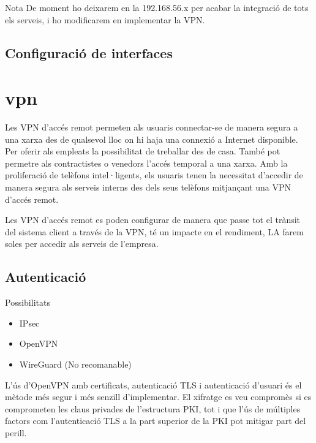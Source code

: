 \documentclass[
  10pt,
]{krantz}
\providecommand{\tightlist}{%
  \setlength{\itemsep}{0pt}\setlength{\parskip}{0pt}}
\begin{document}
\begin{rmdnote}{Nota}
De moment ho deixarem en la 192.168.56.x per acabar la integració de tots els serveis, i ho modificarem en implementar la VPN.

\end{rmdnote}

\hypertarget{configuraciuxf3-de-interfaces}{%
\subsection{Configuració de interfaces}\label{configuraciuxf3-de-interfaces}}

\hypertarget{vpn}{%
\section{vpn}\label{vpn}}

Les VPN d'accés remot permeten als usuaris connectar-se de manera segura a una xarxa des de qualsevol lloc on hi haja una connexió a Internet disponible. Per oferir als empleats la possibilitat de treballar des de casa. També pot permetre als contractistes o venedors l'accés temporal a una xarxa. Amb la proliferació de telèfons intel·ligents, els usuaris tenen la necessitat d'accedir de manera segura als serveis interns des dels seus telèfons mitjançant una VPN d'accés remot.

Les VPN d'accés remot es poden configurar de manera que passe tot el trànsit del sistema client a través de la VPN, té un impacte en el rendiment, LA farem soles per accedir als serveis de l'empresa.

\hypertarget{autenticaciuxf3}{%
\subsection{Autenticació}\label{autenticaciuxf3}}

Possibilitats

\begin{itemize}
\tightlist
\item
  IPsec
\item
  OpenVPN
\item
  WireGuard (No recomanable)
\end{itemize}

L'ús d'OpenVPN amb certificats, autenticació TLS i autenticació d'usuari és el mètode més segur i més senzill d'implementar. El xifratge es veu compromès si es comprometen les claus privades de l'estructura PKI, tot i que l'ús de múltiples factors com l'autenticació TLS a la part superior de la PKI pot mitigar part del perill.
\end{document}
